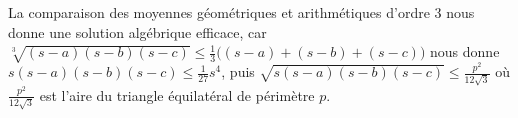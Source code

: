 

\begin{remark}
	La comparaison des moyennes géométriques et arithmétiques d'ordre $3$ nous donne une solution algébrique efficace, car 
	$\sqrt[3]{(s - a)(s - b)(s - c)} \leq \frac13 \big( (s - a) + (s - b) + (s - c) \big)$
	nous donne
	$s(s - a)(s - b)(s - c) \leq \frac{1}{27} s^4$,
	puis
	$\sqrt{s(s - a)(s - b)(s - c)} \leq \frac{p^2}{12 \sqrt{3}}$
	où $\frac{p^2}{12 \sqrt{3}}$ est l'aire du triangle équilatéral de périmètre $p$.
\end{remark}
